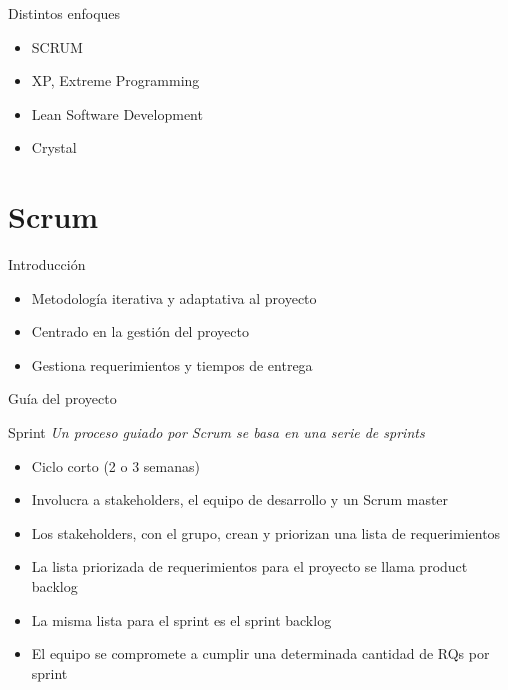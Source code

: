 \documentclass{beamer}
\begin{document}
\begin{frame}{Distintos enfoques}
\begin{itemize}
  \item SCRUM
  \item XP, Extreme Programming
  \item Lean Software Development
  \item Crystal
\end{itemize}
\end{frame}



\section{Scrum}

\begin{frame}{Introducci\'on}
\begin{itemize}
  \item Metodolog\'ia iterativa y adaptativa al proyecto
  \item Centrado en la gesti\'on del proyecto
  \item Gestiona requerimientos y tiempos de entrega
\end{itemize}
\end{frame}

\begin{frame}{Gu\'ia del proyecto}
\begin{center}
\end{center}
\end{frame}

\begin{frame}{Sprint}
\textit{Un proceso guiado por Scrum se basa en una serie de sprints}
\begin{itemize}
        \item Ciclo corto (2 o 3 semanas)
        \item Involucra a stakeholders, el equipo de desarrollo y un Scrum master
        \item Los stakeholders, con el grupo, crean y priorizan una lista de requerimientos
        \item La lista priorizada de requerimientos para el proyecto se llama product backlog
        \item La misma lista para el sprint es el sprint backlog
        \item El equipo se compromete a cumplir una determinada cantidad de RQs por sprint
\end{itemize}
\end{frame}
\end{document}
